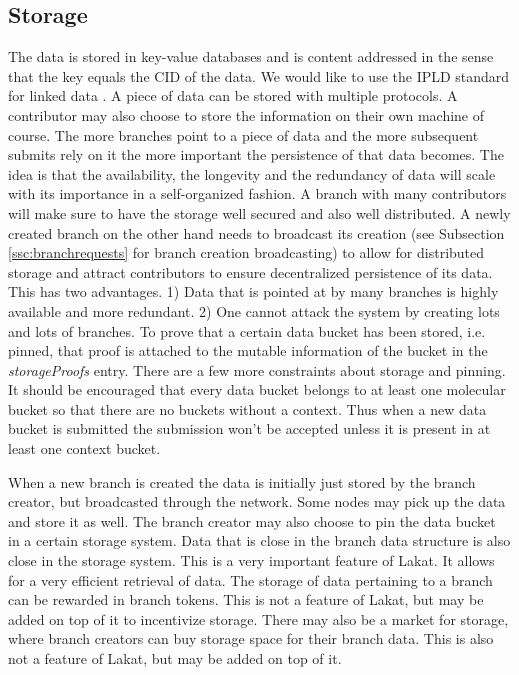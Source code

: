 \subsection{Storage}
\label{ssc:storage}

The data is stored in key-value databases and is content addressed in the sense that the key equals the CID of the data. We would like to use the IPLD standard for linked data \cite{ipld2022}. A piece of data can be stored with multiple protocols. A contributor may also choose to store the information on their own machine of course. The more branches point to a piece of data and the more subsequent submits rely on it the more important the persistence of that data becomes.   
The idea is that the availability, the longevity and the redundancy of data will scale with its importance in a self-organized fashion. A branch with many contributors will make sure to have the storage well secured and also well distributed. A newly created branch on the other hand needs to broadcast its creation (see Subsection \ref{ssc:branchrequests} for branch creation broadcasting) to allow for distributed storage  and attract contributors to ensure decentralized persistence of its data. 
This has two advantages. 1) Data that is pointed at by many branches is highly available and more redundant. 2) One cannot attack the system by creating lots and lots of branches. To prove that a certain data bucket has been stored, i.e. pinned, that proof is attached to the mutable information of the bucket in the \textit{storageProofs} entry. There are a few more constraints about storage and pinning. It should be encouraged that every data bucket belongs to at least one molecular bucket so that there are no buckets without a context. Thus when a new data bucket is submitted the submission won't be accepted unless it is present in at least one context bucket.

When a new branch is created the data is initially just stored by the branch creator, but broadcasted through the network. Some nodes may pick up the data and store it as well. The branch creator may also choose to pin the data bucket in a certain storage system. Data that is close in the branch data structure is also close in the storage system. This is a very important feature of Lakat. It allows for a very efficient retrieval of data. The storage of data pertaining to a branch can be rewarded in branch tokens. This is not a feature of Lakat, but may be added on top of it to incentivize storage. There may also be a market for storage, where branch creators can buy storage space for their branch data. This is also not a feature of Lakat, but may be added on top of it.

